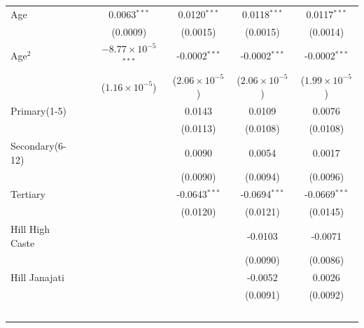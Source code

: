 \begin{tabular}{lccccc}
   Age                                         &                & 0.0063$^{***}$                 & 0.0120$^{***}$          & 0.0118$^{***}$          & 0.0117$^{***}$\\   
                                               &                & (0.0009)                       & (0.0015)                & (0.0015)                & (0.0014)\\   
   Age$^2$                                &                & $-8.77\times 10^{-5}$$^{***}$  & -0.0002$^{***}$         & -0.0002$^{***}$         & -0.0002$^{***}$\\   
                                               &                & ($1.16\times 10^{-5}$)         & ($2.06\times 10^{-5}$)  & ($2.06\times 10^{-5}$)  & ($1.99\times 10^{-5}$)\\    
   Primary(1-5)     &                &                                & 0.0143                  & 0.0109                  & 0.0076\\   
                                               &                &                                & (0.0113)                & (0.0108)                & (0.0108)\\   
   Secondary(6-12)  &                &                                & 0.0090                  & 0.0054                  & 0.0017\\   
                                               &                &                                & (0.0090)                & (0.0094)                & (0.0096)\\   
   Tertiary         &                &                                & -0.0643$^{***}$         & -0.0694$^{***}$         & -0.0669$^{***}$\\   
                                               &                &                                & (0.0120)                & (0.0121)                & (0.0145)\\   
   Hill High Caste              &                &                                &                         & -0.0103                 & -0.0071\\   
                                               &                &                                &                         & (0.0090)                & (0.0086)\\   
   Hill Janajati               &                &                                &                         & -0.0052                 & 0.0026\\   
                                               &                &                                &                         & (0.0091)                & (0.0092)\\   
$$
\end{tabular}

